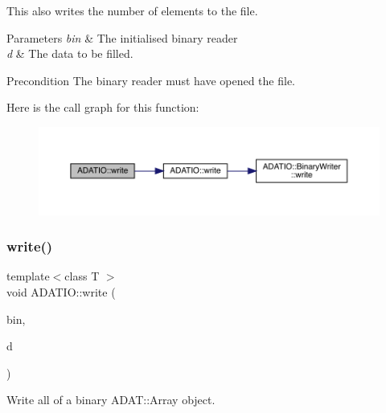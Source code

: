 This also writes the number of elements to the file. 
\begin{DoxyParams}{Parameters}
{\em bin} & The initialised binary reader \\
\hline
{\em d} & The data to be filled.\\
\hline
\end{DoxyParams}
\begin{DoxyPrecond}{Precondition}
The binary reader must have opened the file. 
\end{DoxyPrecond}
Here is the call graph for this function\+:
\nopagebreak
\begin{figure}[H]
\begin{center}
\leavevmode
\includegraphics[width=350pt]{d0/dba/namespaceADATIO_a940fb003df0f6107d020341f78592201_cgraph}
\end{center}
\end{figure}
\mbox{\label{namespaceADATIO_aea9e3ff6a488ce22e363d16085c76a85}} 
\subsubsection{\texorpdfstring{write()}{write()}\hspace{0.1cm}{\footnotesize\ttfamily [23/25]}}
{\footnotesize\ttfamily template$<$class T $>$ \\
void A\+D\+A\+T\+I\+O\+::write (\begin{DoxyParamCaption}\item[{\mbox{\hyperlink{classADATIO_1_1BinaryWriter}{Binary\+Writer}} \&}]{bin,  }\item[{const \mbox{\hyperlink{classADAT_1_1Array1dO}{A\+D\+A\+T\+::\+Array1dO}}$<$ T $>$ \&}]{d }\end{DoxyParamCaption})\hspace{0.3cm}{\ttfamily [inline]}}



Write all of a binary A\+D\+A\+T\+::\+Array object. 

